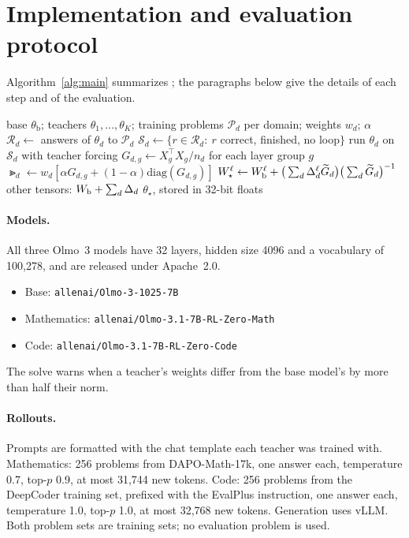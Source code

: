 \FloatBarrier
\section{Implementation and evaluation protocol}
\label{app:eval}

Algorithm~\ref{alg:main} summarizes \method; the paragraphs below give the
details of each step and of the evaluation.

\begin{algorithm}[h]
\caption{\method}
\label{alg:main}
\begin{algorithmic}[1]
\Require base $\theta_{\mathrm{b}}$; teachers $\theta_1,\dots,\theta_K$;
training problems $\mathcal{P}_d$ per domain; weights $w_d$; $\alpha$
 
  \State $\mathcal{R}_d\gets$ answers of $\theta_d$ to $\mathcal{P}_d$
  \State $\mathcal{S}_d\gets\{r\in\mathcal{R}_d:\ r$ correct, finished, no loop$\}$
  \State run $\theta_d$ on $\mathcal{S}_d$ with teacher forcing
  \State $G_{d,g}\gets X_g^{\!\top}X_g/n_d$ for each layer group $g$
\EndFor
{} 
  \State $\Gt_{d}\gets w_d[\alpha G_{d,g}+(1-\alpha)\mathrm{diag}(G_{d,g})]$
  \State $W^\ell_\star\gets W_{\mathrm{b}}^\ell+\big(\sum_d\Delta^\ell_d\widetilde{G}_{d}\big)\big(\sum_d\widetilde{G}_{d}\big)^{-1}$
\EndFor
\State other tensors: $W_{\mathrm{b}}+\sum_d\Delta_d$
\State \Return $\theta_\star$, stored in 32-bit floats
\end{algorithmic}
\end{algorithm}

\paragraph{Models.} All three Olmo~3 models have 32 layers, hidden size 4096
and a vocabulary of 100{,}278, and are released under Apache~2.0.
\begin{itemize}
\item Base: {\small\texttt{allenai/Olmo-3-1025-7B}}
\item Mathematics: {\small\texttt{allenai/Olmo-3.1-7B-RL-Zero-Math}}
\item Code: {\small\texttt{allenai/Olmo-3.1-7B-RL-Zero-Code}}
\end{itemize}
The solve warns when a teacher's weights differ from the base model's by more
than half their norm.

\paragraph{Rollouts.} Prompts are formatted with the chat template each
teacher was trained with. Mathematics: 256 problems from DAPO-Math-17k, one
answer each, temperature 0.7, top-$p$ 0.9, at most 31{,}744 new tokens. Code:
256 problems from the DeepCoder training set, prefixed with the EvalPlus
instruction, one answer each, temperature 1.0, top-$p$ 1.0, at most 32{,}768
new tokens. Generation uses vLLM. Both problem sets are training sets; no
evaluation problem is used.

